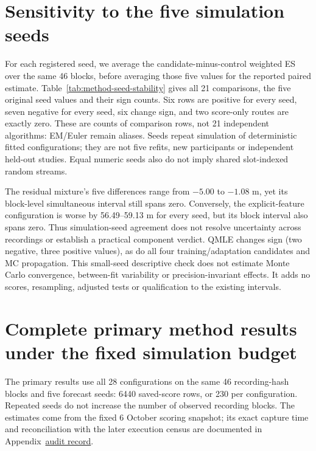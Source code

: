 \section{Sensitivity to the five simulation seeds}
\label{sec:method-seed-stability}\hypertarget{sec:method-seed-stability}{}
For each registered seed, we average the candidate-minus-control weighted
ES over the same 46 blocks, before averaging those five values for the
reported paired estimate. Table~\ref{tab:method-seed-stability} gives all
21 comparisons, the five original seed values and their sign counts.
Six rows are positive for every seed, seven negative for every seed,
six change sign, and two score-only routes are exactly zero. These are
counts of comparison rows, not 21 independent algorithms: EM/Euler remain
aliases. Seeds repeat simulation of deterministic fitted configurations;
they are not five refits, new participants or independent held-out studies.
Equal numeric seeds also do not imply shared slot-indexed random streams.

The residual mixture's five differences range from $-5.00$ to $-1.08$ m,
yet its block-level simultaneous interval still spans zero. Conversely,
the explicit-feature configuration is worse by 56.49--59.13 m for every
seed, but its block interval also spans zero. Thus simulation-seed agreement
does not resolve uncertainty across recordings or establish a practical
component verdict. QMLE changes sign (two negative, three positive values),
as do all four training/adaptation candidates and MC propagation.
This small-seed descriptive check does not estimate Monte Carlo convergence,
between-fit variability or precision-invariant effects. It adds no scores,
resampling, adjusted tests or qualification to the existing intervals.


\section{Complete primary method results under the fixed simulation budget}
\label{sec:preliminary-methods}\hypertarget{sec:preliminary-methods}{}
The primary results use all 28 configurations on the same 46 recording-hash
blocks and five forecast seeds: 6440 saved-score rows, or 230 per
configuration. Repeated seeds do not increase the number of observed
recording blocks. The estimates come from the fixed 6 October scoring
snapshot; its exact capture time and reconciliation with the later execution
census are documented in Appendix~\href{audit-notes.pdf\#sec:score-execution-snapshots}{audit record}.

